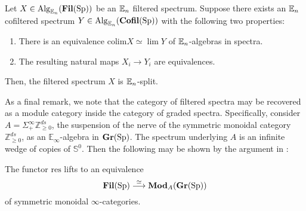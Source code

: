 \begin{thm}\label{thm:SplitMachine}%
Let $X\in \operatorname{\mathrm{Alg}}_{\operatorname{\mathbb{E}}_n}(\operatorname{\mathbf{Fil}}(\operatorname{\mathrm{Sp}}))$ be an $\operatorname{\mathbb{E}}_n$ filtered spectrum.  Suppose there exists an $\operatorname{\mathbb{E}}_n$ cofiltered spectrum $Y\in \operatorname{\mathrm{Alg}}_{\operatorname{\mathbb{E}}_n}(\operatorname{\mathbf{Cofil}}(\operatorname{\mathrm{Sp}}))$ with the following two properties:
\begin{enumerate}
\item There is an equivalence $\mathrm{colim } X \simeq \lim Y$ of $\operatorname{\mathbb{E}}_n$-algebras in spectra.
\item The resulting natural maps $X_i \to Y_i$ are equivalences.  
\end{enumerate}
Then, the filtered spectrum $X$ is $\operatorname{\mathbb{E}}_n$-split.
\end{thm}




As a final remark, we note that the category of filtered spectra may be recovered as a module category inside the category of graded spectra.  Specifically, consider $A=\Sigma^{\infty}_+ \mathbb{Z}^{ds}_{\ge 0}$, the suspension of the nerve of the symmetric monoidal category $\mathbb{Z}^{ds}_{\ge 0}$, as an $\mathbb{E}_\infty$-algebra in $\operatorname{\mathbf{Gr}}(\operatorname{\mathrm{Sp}})$.  The spectrum underlying $A$ is an infinite wedge of copies of $\mathbb{S}^0$.  Then the following may be shown by the argument in \cite[Proposition 3.1.6]{LurieRot}:

\begin{lem} \label{lem:FilAsGrMod}
The functor $\mathrm{res}$ lifts to an equivalence
$$\operatorname{\mathbf{Fil}}(\operatorname{\mathrm{Sp}}) \stackrel{\simeq}{\longrightarrow} \mathbf{Mod}_{A}(\operatorname{\mathbf{Gr}}(\operatorname{\mathrm{Sp}}))$$
of symmetric monoidal $\infty$-categories.
\end{lem}








